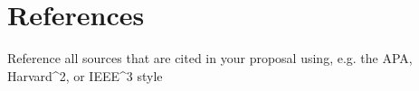 \section{References}

Reference all sources that are cited in your proposal using, e.g. the APA, Harvard^{2}, or IEEE^{3} style
